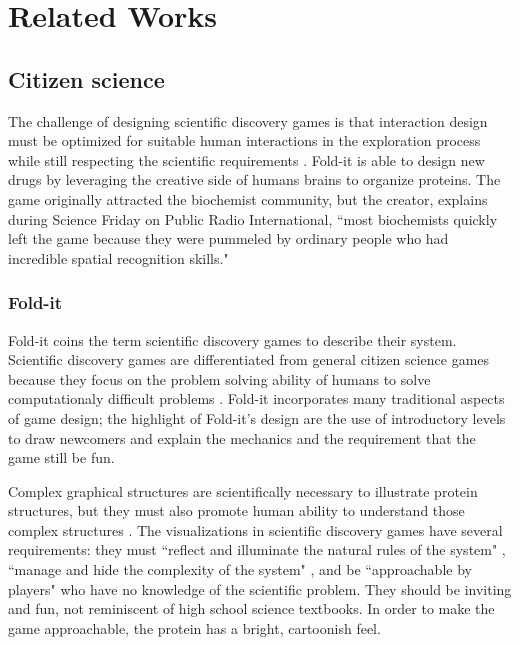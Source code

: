 \chapter{Related Works}

\section{Citizen science}

The challenge of designing scientific discovery games is that interaction design must be optimized for suitable human interactions in the exploration process while still respecting the scientific requirements \cite{cooper2010challenge}. Fold-it is able to design new drugs by leveraging the creative side of humans brains to organize proteins. The game originally attracted the biochemist community, but the creator, explains during Science Friday on Public Radio International, ``most biochemists quickly left the game because they were pummeled by ordinary people who had incredible spatial recognition skills." \cite{sciencefriday2014}

\subsection{Fold-it}

Fold-it coins the term scientific discovery games \cite{cooper2010challenge} to describe their system. Scientific discovery games are differentiated from general citizen science games because they focus on the problem solving ability of humans to solve computationaly difficult problems \cite{cooper2010challenge}. Fold-it incorporates many traditional aspects of game design; the highlight of Fold-it's design are the use of introductory levels to draw newcomers and explain the mechanics and the requirement that the game still be fun. 

Complex graphical structures are scientifically necessary to illustrate protein structures, but they must also promote human ability to understand those complex structures \cite{cooper2010challenge}. The visualizations in scientific discovery games have several requirements: they must ``reflect and illuminate the natural rules of the system" \cite{cooper2010challenge}, ``manage and hide the complexity of the system" \cite{cooper2010challenge}, and be ``approachable by players" \cite{cooper2010challenge} who have no knowledge of the scientific problem. They should be inviting and fun, not reminiscent of high school science textbooks. In order to make the game approachable, the protein has a bright, cartoonish feel. 

